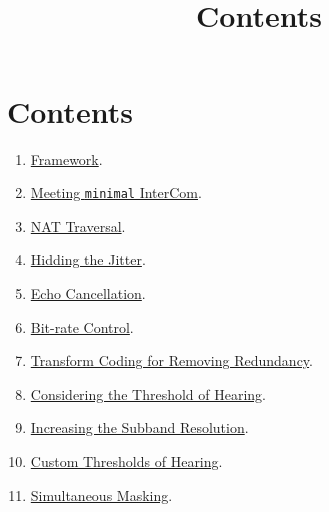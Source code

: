 

\title{\TM{}\\Contents}

\maketitle

\section{Contents}

\begin{enumerate}
\item \href{https://tecnologias-multimedia.github.io/contents/framework/}{Framework}.
\item \href{https://tecnologias-multimedia.github.io/contents/minimal/}{Meeting \texttt{minimal} InterCom}.
\item \href{https://tecnologias-multimedia.github.io/contents/NAT_traversal/}{NAT Traversal}.
\item \href{https://tecnologias-multimedia.github.io/contents/jitter/}{Hidding the Jitter}.
\item \href{https://tecnologias-multimedia.github.io/contents/echo_cancellation/}{Echo Cancellation}.
\item \href{https://tecnologias-multimedia.github.io/contents/BR_control/}{Bit-rate Control}.
\item \href{https://tecnologias-multimedia.github.io/contents/transform_coding/}{Transform Coding for Removing Redundancy}.
\item \href{https://tecnologias-multimedia.github.io/contents/threshold_of_hearing/}{Considering the Threshold of Hearing}.
\item \href{https://tecnologias-multimedia.github.io/contents/high_resolution_ToH/}{Increasing the Subband Resolution}.
\item \href{https://tecnologias-multimedia.github.io/contents/custom_ToH/}{Custom Thresholds of Hearing}.
\item \href{https://tecnologias-multimedia.github.io/contents/simultaneous_masking/}{Simultaneous Masking}.
\end{enumerate}


%
